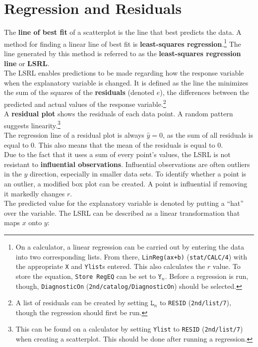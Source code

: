 \documentclass[../AP_Statistics.tex]{subfiles}
\begin{document}
		\section{Regression and Residuals}
			The \textbf{line of best fit} of a scatterplot is the line that best predicts the data. A method for finding a linear line of best fit is \textbf{least-squares regression}.\footnote{On a calculator, a linear regression can be carried out by entering the data into two corresponding lists. From there, \texttt{LinReg(ax+b)} (\texttt{stat/CALC/4}) with the appropriate \texttt{X} and \texttt{Ylist}s entered. This also calculates the $r$ value. To store the equation, \texttt{Store RegEQ} can be set to $\texttt{Y}_n$. Before a regression is run, though, \texttt{DiagnosticOn} (\texttt{2nd/catalog/DiagnosticOn}) should be selected.} The line generated by this method is referred to as the \textbf{least-squares regression line} or \textbf{LSRL}. \\
			The LSRL enables predictions to be made regarding how the response variable when the explanatory variable is changed. It is defined as the line the minimizes the sum of the squares of the \textbf{residuals} (denoted $e$), the differences between the predicted and actual values of the response variable.\footnote{A list of residuals can be created by setting $\texttt{L}_n$ to \texttt{RESID} (\texttt{2nd/list/7}), though the regression should first be run.} \\
			A \textbf{residual plot} shows the residuals of each data point. A random pattern suggests linearity.\footnote{This can be found on a calculator by setting \texttt{Ylist} to \texttt{RESID} (\texttt{2nd/list/7}) when creating a scatterplot. This should be done after running a regression.} \\
			The regression line of a residual plot is always $\hat{y} = 0$, as the sum of all residuals is equal to 0. This also means that the mean of the residuals is equal to 0. \\
			Due to the fact that it uses a sum of every point's values, the LSRL is not resistant to \textbf{influential observations}. Influential observations are often outliers in the $y$ direction, especially in smaller data sets. To identify whether a point is an outlier, a modified box plot can be created. A point is influential if removing it markedly changes $r$. \\
			The predicted value for the explanatory variable is denoted by putting a \enquote{hat} over the variable.
			The LSRL can be described as a linear transformation that maps $x$ onto $y$:		
\end{document}
